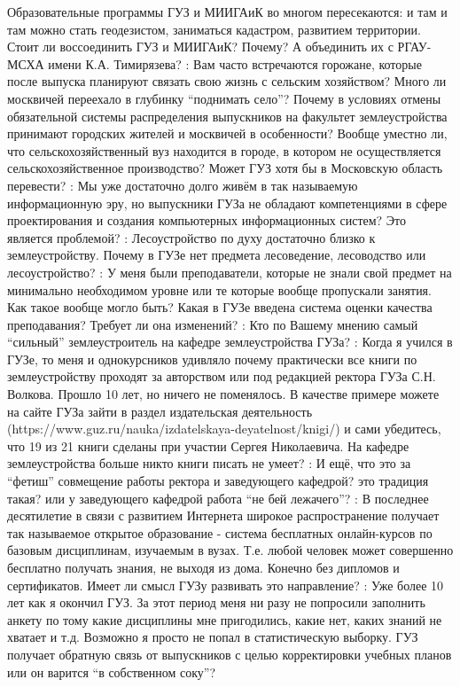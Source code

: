 \begin{drama}
Образовательные программы ГУЗ и МИИГАиК во многом пересекаются: и там и там можно стать геодезистом, заниматься кадастром, развитием территории. Стоит ли воссоединить ГУЗ и МИИГАиК? Почему? А объединить их с РГАУ-МСХА имени К.А. Тимирязева?
	\maxspeaks: Вам часто встречаются горожане, которые после выпуска планируют связать свою жизнь с сельским хозяйством? Много ли москвичей переехало в глубинку “поднимать село”? Почему в условиях отмены обязательной системы распределения выпускников на факультет землеустройства принимают городских жителей и москвичей в особенности? Вообще уместно ли, что сельскохозяйственный вуз находится в городе, в котором не осуществляется сельскохозяйственное производство? Может ГУЗ хотя бы в Московскую область перевести?
	\maxspeaks: Мы уже достаточно долго живём в так называемую информационную эру, но выпускники ГУЗа не обладают компетенциями в сфере проектирования и создания компьютерных информационных систем? Это является проблемой?
	\maxspeaks: Лесоустройство по духу достаточно близко к землеустройству. Почему в ГУЗе нет предмета лесоведение, лесоводство или лесоустройство?
	\maxspeaks: У меня были преподаватели, которые не знали свой предмет на минимально необходимом уровне или те которые вообще пропускали занятия. Как такое вообще могло быть? Какая в ГУЗе введена система оценки качества преподавания? Требует ли она изменений?
	\maxspeaks: Кто по Вашему мнению самый “сильный” землеустроитель на кафедре землеустройства ГУЗа?
	\maxspeaks: Когда я учился в ГУЗе, то меня и однокурсников удивляло почему практически все книги по землеустройству проходят за авторством или под редакцией ректора ГУЗа С.Н. Волкова. Прошло 10 лет, но ничего не поменялось. В качестве примере можете на сайте ГУЗа зайти в раздел издательская деятельность (https://www.guz.ru/nauka/izdatelskaya-deyatelnost/knigi/) и сами убедитесь, что 19 из 21 книги сделаны при участии Сергея Николаевича. На кафедре землеустройства больше никто книги писать не умеет? 
	\maxspeaks: И ещё, что это за “фетиш” совмещение работы ректора и заведующего кафедрой? это традиция такая? или у заведующего кафедрой работа “не бей лежачего”? 
	\maxspeaks: В последнее десятилетие в связи с развитием Интернета широкое распространение получает так называемое открытое образование - система бесплатных онлайн-курсов по базовым дисциплинам, изучаемым в вузах. Т.е. любой человек может совершенно бесплатно получать знания, не выходя из дома. Конечно без дипломов и сертификатов. Имеет ли смысл ГУЗу развивать это направление?
	\maxspeaks: Уже более 10 лет как я окончил ГУЗ. За этот период меня ни разу не попросили заполнить анкету по тому какие дисциплины мне пригодились, какие нет, каких знаний не хватает и т.д. Возможно я просто не попал в статистическую выборку. ГУЗ получает обратную связь от выпускников с целью корректировки учебных планов или он варится “в собственном соку”?

\end{drama}
